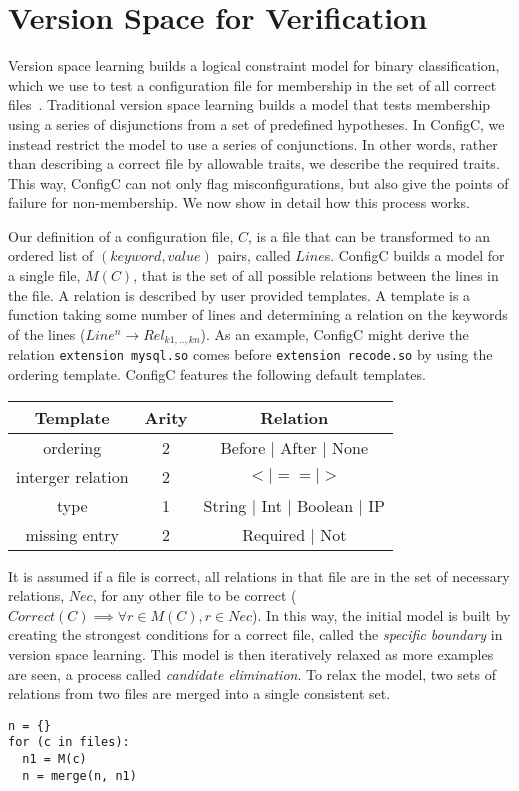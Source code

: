 \section{Version Space for Verification}

Version space learning builds a logical constraint model for binary classification, which we use to test a configuration file for membership in the set of all correct files~\cite{mitchell82}.
Traditional version space learning builds a model that tests membership using a series of disjunctions from a set of predefined hypotheses.
In ConfigC, we instead restrict the model to use a series of conjunctions.
In other words, rather than describing a correct file by allowable traits, we describe the required traits. 
This way, ConfigC can not only flag misconfigurations, but also give the points of failure for non-membership.
We now show in detail how this process works.

Our definition of a configuration file, $C$, is a file that can be transformed to an ordered list of $(keyword, value)$ pairs, called $Line$s.
ConfigC builds a model for a single file, $M(C)$, that is the set of all possible relations between the lines in the file.
A relation is described by user provided templates.
A template is a function taking some number of lines and determining a relation on the keywords of the lines ($Line^{n} \rightarrow Rel_{k1,..,kn}$).
As an example, ConfigC might derive the relation \texttt{extension mysql.so} comes before \texttt{extension recode.so} by using the ordering template.
ConfigC features the following default templates.

\begin{center}
\begin{tabular} {|c |c |c |}
 \hline
 Template & Arity & Relation \\
\hline
 ordering &            2 & Before $\vert$ After $\vert$ None \\
\hline
 interger relation &     2  & $< | == | >$  \\
\hline
 type &                1  & String $\vert$ Int $\vert$ Boolean $\vert$ IP  \\
\hline
 missing entry &       2 & Required $\vert$ Not \\
\hline
\end{tabular}
\end{center}

It is assumed if a file is correct, all relations in that file are in the set of necessary relations, $Nec$, for any other file to be correct ($Correct(C) \implies \forall r \in M(C), r \in Nec$).
In this way, the initial model is built by creating the strongest conditions for a correct file, called the \textit{specific boundary} in version space learning.
This model is then iteratively relaxed as more examples are seen, a process called \textit{candidate elimination}.
To relax the model, two sets of relations from two files are merged into a single consistent set.
\begin{lstlisting}
n = {}
for (c in files):
  n1 = M(c)
  n = merge(n, n1)
\end{lstlisting}

